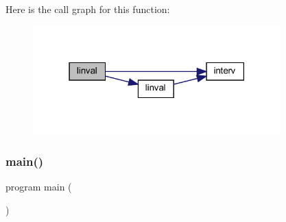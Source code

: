 Here is the call graph for this function\+:\nopagebreak
\begin{figure}[H]
\begin{center}
\leavevmode
\includegraphics[width=271pt]{Leroi__c_8f90_accb3ec8ce6fe855a60b0c1959fc6e2c8_cgraph}
\end{center}
\end{figure}
\mbox{\label{Leroi__c_8f90_a8ec2266d83cd6c0b762cbcbc92c0af3d}} 
\subsubsection{\texorpdfstring{main()}{main()}}
{\footnotesize\ttfamily program main (\begin{DoxyParamCaption}{ }\end{DoxyParamCaption})}

